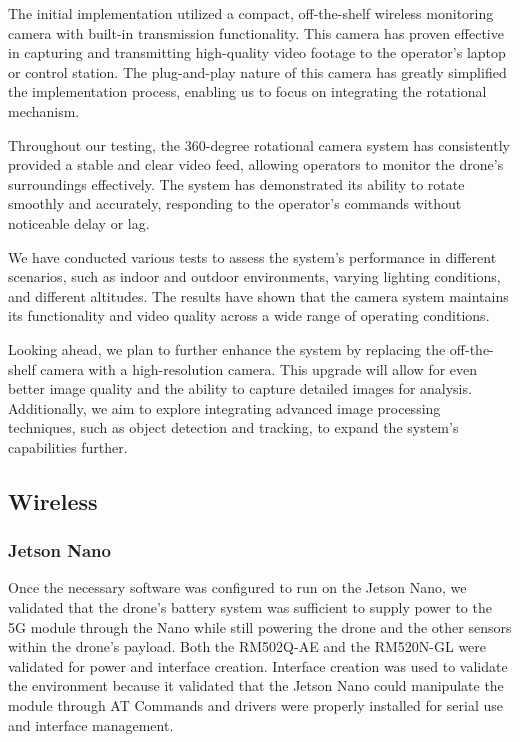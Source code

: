 \documentclass[conference]{IEEEtran}
\begin{document}
The initial implementation utilized a compact, off-the-shelf wireless monitoring camera with built-in transmission functionality. This camera has proven effective in capturing and transmitting high-quality video footage to the operator's laptop or control station. The plug-and-play nature of this camera has greatly simplified the implementation process, enabling us to focus on integrating the rotational mechanism.

Throughout our testing, the 360-degree rotational camera system has consistently provided a stable and clear video feed, allowing operators to monitor the drone's surroundings effectively. The system has demonstrated its ability to rotate smoothly and accurately, responding to the operator's commands without noticeable delay or lag.

We have conducted various tests to assess the system's performance in different scenarios, such as indoor and outdoor environments, varying lighting conditions, and different altitudes. The results have shown that the camera system maintains its functionality and video quality across a wide range of operating conditions.

Looking ahead, we plan to further enhance the system by replacing the off-the-shelf camera with a high-resolution camera. This upgrade will allow for even better image quality and the ability to capture detailed images for analysis. Additionally, we aim to explore integrating advanced image processing techniques, such as object detection and tracking, to expand the system's capabilities further.

\subsection{Wireless}
\subsubsection{Jetson Nano}
 Once the necessary software was configured to run on the Jetson Nano, we validated that the drone's battery system was sufficient to supply power to the 5G module through the Nano while still powering the drone and the other sensors within the drone's payload. Both the RM502Q-AE and the RM520N-GL were validated for power and interface creation. Interface creation was used to validate the environment because it validated that the Jetson Nano could manipulate the module through AT Commands and drivers were properly installed for serial use and interface management. 
\end{document}
